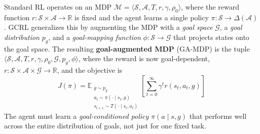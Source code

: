 \documentclass[11pt, letterpaper]{article}
\begin{document}
\begin{concept}
    Standard RL operates on an MDP \(\mathcal{M} = \langle \mathcal{S}, \mathcal{A}, T, r, \gamma, \rho_0 \rangle\), where the reward function \(r : \mathcal{S} \times \mathcal{A} \to \mathbb{R}\) is fixed and the agent learns a single policy \(\pi : \mathcal{S} \to \Delta(\mathcal{A})\). GCRL generalizes this by augmenting the MDP with a \textit{goal space} \(\mathcal{G}\), a \textit{goal distribution} \(p_g\), and a \textit{goal-mapping function} \(\phi : \mathcal{S} \to \mathcal{G}\) that projects states onto the goal space. The resulting \textbf{goal-augmented MDP} (GA-MDP) is the tuple \(\langle \mathcal{S}, \mathcal{A}, T, r, \gamma, \rho_0, \mathcal{G}, p_g, \phi \rangle\), where the reward is now goal-dependent, \(r : \mathcal{S} \times \mathcal{A} \times \mathcal{G} \to \mathbb{R}\), and the objective is
    \[
        J(\pi) = \mathbb{E}_{\substack{g \sim p_g \\ a_t \sim \pi(\cdot \mid s_t, g) \\ s_{t+1} \sim T(\cdot \mid s_t, a_t)}} \left[ \sum_{t=0}^\infty \gamma^t r(s_t, a_t, g) \right]
    \]
    The agent must learn a \textit{goal-conditioned policy} \(\pi(a \mid s, g)\) that performs well across the entire distribution of goals, not just for one fixed task.
\end{concept}
 
\end{document}
